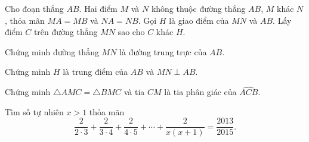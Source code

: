 \begin{bt}[2,0 điểm]
Cho đoạn thẳng $AB$. Hai điểm $M$ và $N$ không thuộc đường thẳng $AB$, $M$ khác $N$, thỏa mãn $MA=MB$ và $NA=NB$. Gọi $H$ là giao điểm của $MN$ và $AB$. Lấy điểm $C$ trên đường thẳng $MN$ sao cho $C$ khác $H$.
\begin{listEX}[1]
\item Chứng minh đường thẳng $MN$ là đường trung trực của $AB$.
\item Chứng minh $H$ là trung điểm của $AB$ và $MN\perp AB$.
\item Chứng minh $\triangle AMC=\triangle BMC$ và tia $CM$ là tia phân giác của $\widehat{ACB}$.
\end{listEX}
\end{bt}

\begin{bt}[0,5 điểm]
Tìm số tự nhiên $x>1$ thỏa mãn
\[
\dfrac{2}{2\cdot 3}+\dfrac{2}{3\cdot 4}+\dfrac{2}{4\cdot 5}+\cdots+\dfrac{2}{x(x+1)}=\dfrac{2013}{2015}.
\]
\end{bt}
